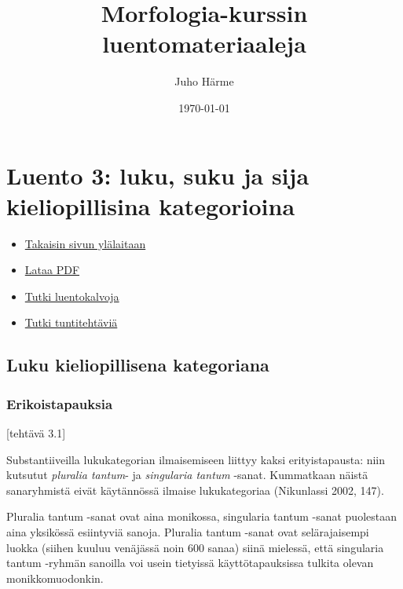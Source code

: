 \documentclass[]{scrartcl}
\author{Juho Härme}
\title{Morfologia-kurssin luentomateriaaleja}
\date{\today}
\begin{document}
\maketitle
\tableofcontents
\newpage



\section{Luento 3: luku, suku ja sija kieliopillisina
kategorioina}\label{luento-3-luku-suku-ja-sija-kieliopillisina-kategorioina}

\begin{itemize}
\itemsep1pt\parskip0pt
\item
  \href{https://mustikka.uta.fi/~juho_harme/morfologia/\#tästä-kurssista}{Takaisin
  sivun ylälaitaan}
\item
  \href{http://mustikka.uta.fi/~juho_harme/morfologia/materiaalit/luento3.pdf}{Lataa
  PDF}
\item
  \href{http://mustikka.uta.fi/~juho_harme/morfologia/presentations/luento3.html}{Tutki
  luentokalvoja}
\item
  \href{http://mustikka.uta.fi/~juho_harme/morfologia/tehtavat/luento3.pdf}{Tutki
  tuntitehtäviä}
\end{itemize}

\subsection{Luku kieliopillisena
kategoriana}\label{luku-kieliopillisena-kategoriana}

\subsubsection{Erikoistapauksia}\label{erikoistapauksia}

{[}tehtävä 3.1{]}

Substantiiveilla lukukategorian ilmaisemiseen liittyy kaksi
erityistapausta: niin kutsutut \emph{pluralia tantum}- ja
\emph{singularia tantum} -sanat. Kummatkaan näistä sanaryhmistä eivät
käytännössä ilmaise lukukategoriaa (Nikunlassi 2002, 147).

Pluralia tantum -sanat ovat aina monikossa, singularia tantum -sanat
puolestaan aina yksikössä esiintyviä sanoja. Pluralia tantum -sanat ovat
selärajaisempi luokka (siihen kuuluu venäjässä noin 600 sanaa) siinä
mielessä, että singularia tantum -ryhmän sanoilla voi usein tietyissä
käyttötapauksissa tulkita olevan monikkomuodonkin.
\end{document}
